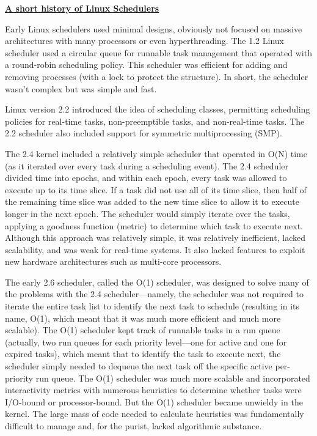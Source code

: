 \documentclass{article}
\begin{document}
\bigskip

\textbf{\underline{A short history of Linux Schedulers}}

Early Linux schedulers used minimal designs, obviously not focused on massive architectures with many processors or even hyperthreading. The 1.2 Linux scheduler used a circular queue for runnable task management that operated with a round-robin scheduling policy. This scheduler was efficient for adding and removing processes (with a lock to protect the structure). In short, the scheduler wasn’t complex but was simple and fast.

Linux version 2.2 introduced the idea of scheduling classes, permitting scheduling policies for real-time tasks, non-preemptible tasks, and non-real-time tasks. The 2.2 scheduler also included support for symmetric multiprocessing (SMP).

The 2.4 kernel included a relatively simple scheduler that operated in O(N) time (as it iterated over every task during a scheduling event). The 2.4 scheduler divided time into epochs, and within each epoch, every task was allowed to execute up to its time slice. If a task did not use all of its time slice, then half of the remaining time slice was added to the new time slice to allow it to execute longer in the next epoch. The scheduler would simply iterate over the tasks, applying a goodness function (metric) to determine which task to execute next. Although this approach was relatively simple, it was relatively inefficient, lacked scalability, and was weak for real-time systems. It also lacked features to exploit new hardware architectures such as multi-core processors.

The early 2.6 scheduler, called the O(1) scheduler, was designed to solve many of the problems with the 2.4 scheduler—namely, the scheduler was not required to iterate the entire task list to identify the next task to schedule (resulting in its name, O(1), which meant that it was much more efficient and much more scalable). The O(1) scheduler kept track of runnable tasks in a run queue (actually, two run queues for each priority level—one for active and one for expired tasks), which meant that to identify the task to execute next, the scheduler simply needed to dequeue the next task off the specific active per-priority run queue. The O(1) scheduler was much more scalable and incorporated interactivity metrics with numerous heuristics to determine whether tasks were I/O-bound or processor-bound. But the O(1) scheduler became unwieldy in the kernel. The large mass of code needed to calculate heuristics was fundamentally difficult to manage and, for the purist, lacked algorithmic substance.
\end{document}
